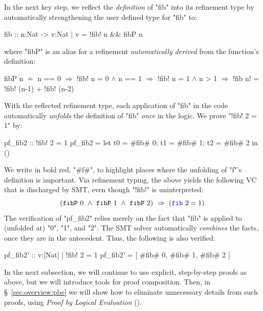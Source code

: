 %
In the next key step, we reflect the \emph{definition}
of "fib" into its refinement type by automatically
strengthening the user defined type for "fib" to:
%
\begin{mcode}
    fib :: n:Nat -> { v:Nat | v = !fib! n && fibP n }
\end{mcode}
%
where "fibP" is an alias for a refinement
\emph{automatically derived} from the
function's definition:
%
\begin{mcode}
    fibP n $\doteq$ n == 0 $\Rightarrow$ !fib! n = 0
           $\wedge$ n == 1 $\Rightarrow$ !fib! n = 1
           $\wedge$ n  > 1 $\Rightarrow$ !fib n! = !fib! (n-1) + !fib! (n-2)
\end{mcode}

%
With the reflected refinement
type, each application of "fib"
in the code automatically
\emph{unfolds} the definition
of "fib" \textit{once} in the logic.
%
We prove "{!fib! 2 = 1}" by:
%
\begin{mcode}
    pf_fib2 :: { !fib! 2 = 1 }
    pf_fib2 = let { t0 = #fib# 0; t1 = #fib# 1; t2 = #fib# 2 } in ()
\end{mcode}
%
We write in bold red, "#f#", to highlight places where the
unfolding of "f"'s definition is important.
%
Via refinement typing, the above yields the
following VC that is discharged by SMT, even
though "!fib!" is uninterpreted:
%
$$(\fibdef\ 0 \ \wedge\ \fibdef\ 1 \ \wedge\ \fibdef\ 2) \  \Rightarrow\ (\fib{2} = 1)$$
%
%
The verification of "pf_fib2" relies
merely on the fact that "fib" is applied
to (\ie unfolded at) "0", "1", and "2".
%
The SMT solver automatically \emph{combines}
the facts, once they are in the antecedent.
Thus, the following is also verified:
%
\begin{mcode}
    pf_fib2' :: {v:[Nat] | !fib! 2 = 1 }
    pf_fib2' = [ #fib# 0, #fib# 1, #fib# 2 ]
\end{mcode}

In the next subsection, we will continue to use explicit,
step-by-step proofs as above, but we will introduce tools 
for proof composition.  
%
Then, in \S~\ref{sec:overview:pbe} we will show how to 
eliminate unnecessary details from such proofs, using 
\emph{Proof by Logical Evaluation} (\pbesym).

